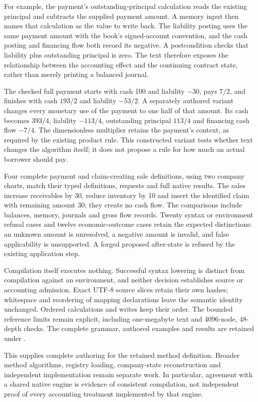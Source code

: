 For example, the payment's outstanding-principal calculation reads the
existing principal and subtracts the supplied payment amount. A memory input
then names that calculation as the value to write back. The liability posting
uses the same payment amount with the book's signed-account convention, and
the cash posting and financing flow both record its negative. A postcondition
checks that liability plus outstanding principal is zero. The text therefore
exposes the relationship between the accounting effect and the continuing
contract state, rather than merely printing a balanced journal.

The checked full payment starts with cash 100 and liability $-30$, pays
$7/2$, and finishes with cash $193/2$ and liability $-53/2$. A separately
authored variant changes every monetary use of the payment to one half of that
amount. Its cash becomes $393/4$, liability $-113/4$, outstanding principal
$113/4$ and financing cash flow $-7/4$. The dimensionless multiplier retains
the payment's context, as required by the existing product rule. This
constructed variant tests whether text changes the algorithm itself; it does
not propose a rule for how much an actual borrower should pay.

Four complete payment and claim-creating sale definitions, using two company
charts, match their typed definitions, requests and full native results.
The sales increase receivables by 30, reduce inventory by 10 and insert the
identified claim with remaining amount 30; they create no cash flow. The
comparisons include balances, memory, journals and gross flow records. Twenty
syntax or environment refusal cases and twelve economic-outcome cases retain
the expected distinctions: an unknown amount is unresolved, a negative amount
is invalid, and false applicability is unsupported. A forged proposed
after-state is refused by the existing application step.

Compilation itself executes nothing. Successful syntax lowering is distinct
from compilation against an environment, and neither decision establishes
source or accounting admission. Exact UTF-8 source slices retain their own
hashes; whitespace and reordering of mapping declarations leave the semantic
identity unchanged. Ordered calculations and writes keep their order. The
bounded reference limits remain explicit, including one-megabyte text and
4096-node, 48-depth checks. The complete grammar, authored examples and results
are retained under
.

This supplies complete authoring for the retained method definition. Broader
method algorithms, registry loading, company-state reconstruction and independent
implementation remain separate work. In particular, agreement with a shared
native engine is evidence of consistent compilation, not independent proof of
every accounting treatment implemented by that engine.
